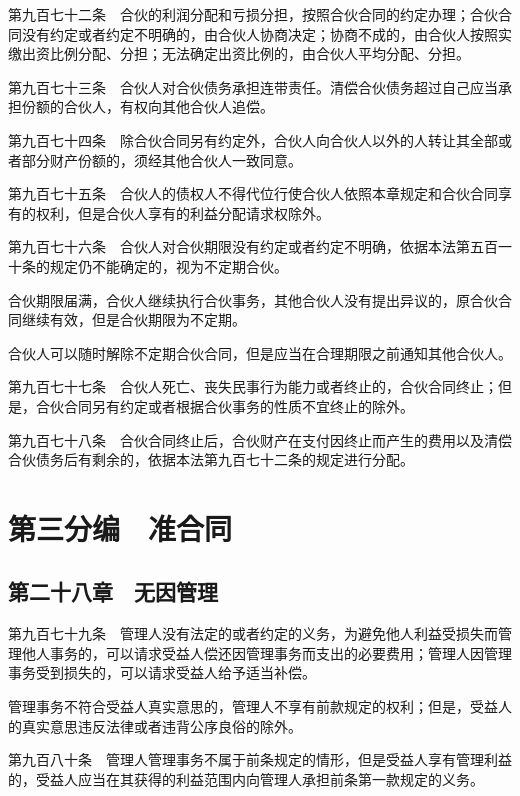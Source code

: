 \documentclass[UTF8,12pt,a4paper]{ctexbook}
\begin{document}
第九百七十二条　合伙的利润分配和亏损分担，按照合伙合同的约定办理；合伙合同没有约定或者约定不明确的，由合伙人协商决定；协商不成的，由合伙人按照实缴出资比例分配、分担；无法确定出资比例的，由合伙人平均分配、分担。

第九百七十三条　合伙人对合伙债务承担连带责任。清偿合伙债务超过自己应当承担份额的合伙人，有权向其他合伙人追偿。

第九百七十四条　除合伙合同另有约定外，合伙人向合伙人以外的人转让其全部或者部分财产份额的，须经其他合伙人一致同意。

第九百七十五条　合伙人的债权人不得代位行使合伙人依照本章规定和合伙合同享有的权利，但是合伙人享有的利益分配请求权除外。

第九百七十六条　合伙人对合伙期限没有约定或者约定不明确，依据本法第五百一十条的规定仍不能确定的，视为不定期合伙。

合伙期限届满，合伙人继续执行合伙事务，其他合伙人没有提出异议的，原合伙合同继续有效，但是合伙期限为不定期。

合伙人可以随时解除不定期合伙合同，但是应当在合理期限之前通知其他合伙人。

第九百七十七条　合伙人死亡、丧失民事行为能力或者终止的，合伙合同终止；但是，合伙合同另有约定或者根据合伙事务的性质不宜终止的除外。

第九百七十八条　合伙合同终止后，合伙财产在支付因终止而产生的费用以及清偿合伙债务后有剩余的，依据本法第九百七十二条的规定进行分配。

\cleardoublepage
{}
\chapter*{第三分编　准合同}

\section*{第二十八章　无因管理}

第九百七十九条　管理人没有法定的或者约定的义务，为避免他人利益受损失而管理他人事务的，可以请求受益人偿还因管理事务而支出的必要费用；管理人因管理事务受到损失的，可以请求受益人给予适当补偿。

管理事务不符合受益人真实意思的，管理人不享有前款规定的权利；但是，受益人的真实意思违反法律或者违背公序良俗的除外。

第九百八十条　管理人管理事务不属于前条规定的情形，但是受益人享有管理利益的，受益人应当在其获得的利益范围内向管理人承担前条第一款规定的义务。
\end{document}
